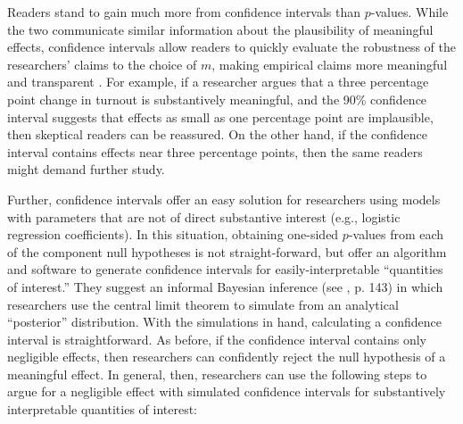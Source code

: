 \documentclass[12pt]{article}
\begin{document}
Readers stand to gain much more from confidence intervals than $p$-values. While the two communicate similar information about the plausibility of meaningful effects, confidence intervals allow readers to quickly evaluate the robustness of the researchers' claims to the choice of $m$, making empirical claims more meaningful and transparent \citep{Metzler1974, Westlake1979}. For example, if a researcher argues that a three percentage point change in turnout is substantively meaningful, and the 90\% confidence interval suggests that effects as small as one percentage point are implausible, then skeptical readers can be reassured. On the other hand, if the confidence interval contains effects near three percentage points, then the same readers might demand further study.

Further, confidence intervals offer an easy solution for researchers using models with parameters that are not of direct substantive interest (e.g., logistic regression coefficients). In this situation, obtaining one-sided $p$-values from each of the component null hypotheses is not straight-forward, but  \cite{KingTomzWhittenburg2000} offer an algorithm and software to generate confidence intervals for easily-interpretable ``quantities of interest.'' They suggest an informal Bayesian inference (see \citealt{GelmanHill2007}, p. 143) in which researchers use the central limit theorem to simulate from an analytical ``posterior'' distribution. With the simulations in hand, calculating a confidence interval is straightforward. As before, if the confidence interval contains only negligible effects, then researchers can confidently reject the null hypothesis of a meaningful effect. In general, then, researchers can use the following steps to argue for a negligible effect with simulated confidence intervals for substantively interpretable quantities of interest:
\end{document}
